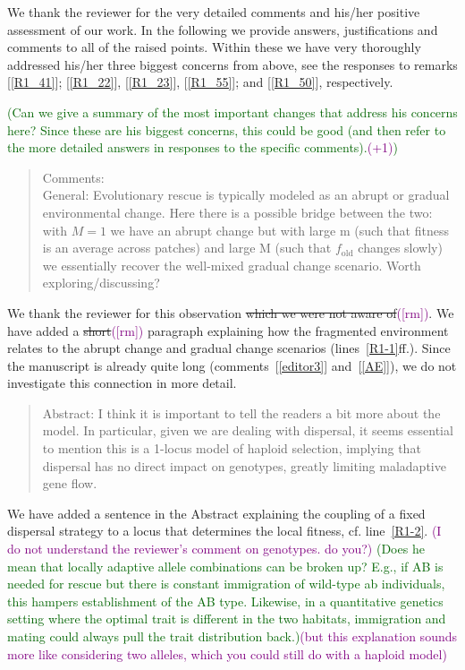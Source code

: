 \documentclass[11pt]{article}
\newenvironment{referee}{\vspace{0.cm} \sffamily \color{colreferee} \begin{quotation} }{\end{quotation} \vspace{0.cm}}
\newcommand{\lmarginpar}[1]{\reversemarginpar\marginpar{\textcolor{colreferee}{\textbf{\textsf{[#1]}}}}}
\newcommand{\addnb}[1]{\refstepcounter{numcom}\lmarginpar{\arabic{numcom}}\label{#1}}
\newcommand{\comref}[1]{[\ref{#1}]}
\newcommand{\florence}[1]{\textcolor{purple}{(#1)}}
\newcommand{\hildegard}[1]{\textcolor{darkgreen}{(#1)}}
\newcounter{numcom}
\begin{document}
%
We thank the reviewer for the very detailed comments and his/her positive assessment of our work. In the following we provide answers, justifications and comments to all of the raised points. Within these we have very thoroughly addressed his/her three biggest concerns from above, see the responses to remarks \comref{R1_41}; \comref{R1_22}, \comref{R1_23}, \comref{R1_55}; and \comref{R1_50}, respectively.  

\hildegard{Can we give a summary of the most important changes that address his concerns here? Since these are his biggest concerns, this could be good (and then refer to the more detailed answers in responses to the specific comments).\florence{+1}}

\begin{referee}
\noindent Comments:\addnb{R1_1} \vspace{-10pt}\\

General: Evolutionary rescue is typically modeled as an abrupt or gradual environmental change. Here there is a possible bridge between the two: with $M=1$ we have an abrupt change but with large m (such that fitness is an average across patches) and large M (such that $f_{\text{old}}$ changes slowly) we essentially recover the well-mixed gradual change scenario. Worth exploring/discussing?
\end{referee}

We thank the reviewer for this observation\st{ which we were not aware of}\florence{[rm]}. We have added a \st{short}\florence{[rm]} paragraph explaining how the fragmented environment relates to the abrupt change and gradual change scenarios (lines~\ref{R1-1}ff.). Since the manuscript is already quite long (comments~\comref{editor3} and~\comref{AE}), we do not investigate this connection in more detail.

\begin{referee}
Abstract:\addnb{R1_2} I think it is important to tell the readers a bit more about the model. In particular, given we are dealing with dispersal, it seems essential to mention this is a 1-locus model of haploid selection, implying that dispersal has no direct impact on genotypes, greatly limiting maladaptive gene flow. 
\end{referee}

We have added a sentence in the Abstract explaining the coupling of a fixed dispersal strategy to a locus that determines the local fitness, cf. line~\ref{R1-2}. \florence{I do not understand the reviewer's comment on genotypes. do you?} \hildegard{Does he mean that locally adaptive allele combinations can be broken up? E.g., if AB is needed for rescue but there is constant immigration of wild-type ab individuals, this hampers establishment of the AB type. Likewise, in a quantitative genetics setting where the optimal trait is different in the two habitats, immigration and mating could always pull the trait distribution back.}\florence{but this explanation sounds more like considering two alleles, which you could still do with a haploid model}
\end{document}
